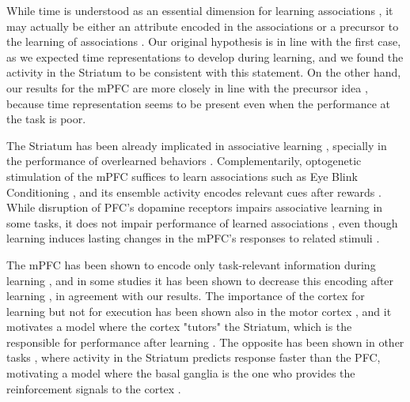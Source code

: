     While time is understood as an essential dimension for learning associations \cite{balsam2009temporal,kirkpatrick2016associative}, it may actually be either an attribute encoded in the associations \cite{molet2014timing} or a precursor to the learning of associations \cite{balsam2002timing}. Our original hypothesis is in line with the first case, as we expected time representations to develop during learning, and we found the activity in the Striatum to be consistent with this statement. On the other hand, our results for the mPFC are more closely in line with the precursor idea \cite{balsam2002timing}, because time representation seems to be present even when the performance at the task is poor. 
    
    The Striatum has been already implicated in associative learning \cite{li2011differential,liljeholm2012contributions}, specially in the performance of overlearned behaviors \cite{smith2013dual}. Complementarily, optogenetic stimulation of the mPFC suffices to learn associations such as Eye Blink Conditioning \cite{wu2015optogenetic}, and its ensemble activity encodes relevant cues after rewards \cite{maggi2018ensemble}. While disruption of PFC's dopamine receptors impairs associative learning in some tasks, it does not impair performance of learned associations \cite{puig2012role, puig2014prefrontal}, even though learning induces lasting changes in the mPFC's responses to related stimuli \cite{takehara2008spontaneous}.
    
    The mPFC has been shown to encode only task-relevant information during learning \cite{kaplan2017role}, and in some studies it has been shown to decrease this encoding after learning \cite{schuck2015medial}, in agreement with our results. The importance of the cortex for learning but not for execution has been shown also in the motor cortex \cite{kawai2015motor}, and it motivates a model where the cortex "tutors" the Striatum, which is the responsible for performance after learning \cite{murray2017learning}. The opposite has been shown in other tasks \cite{pasupathy2005different}, where activity in the Striatum predicts response faster than the PFC, motivating a model where the basal ganglia is the one who provides the reinforcement signals to the cortex \cite{helie2015learning}. 

